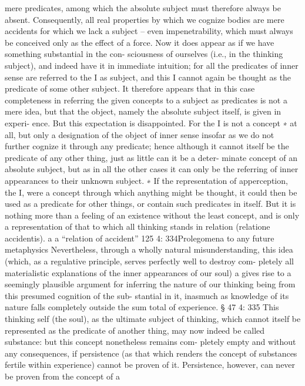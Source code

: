 mere predicates, among which the absolute subject must therefore always
be absent. Consequently, all real properties by which we cognize bodies
are mere accidents for which we lack a subject – even impenetrability,
which must always be conceived only as the effect of a force.
Now it does appear as if we have something substantial in the con-
sciousness of ourselves (i.e., in the thinking subject), and indeed have it
in immediate intuition; for all the predicates of inner sense are referred
to the I as subject, and this I cannot again be thought as the predicate of
some other subject. It therefore appears that in this case completeness in
referring the given concepts to a subject as predicates is not a mere idea,
but that the object, namely the absolute subject itself, is given in experi-
ence. But this expectation is disappointed. For the I is not a concept ∗ at
all, but only a designation of the object of inner sense insofar as we do
not further cognize it through any predicate; hence although it cannot
itself be the predicate of any other thing, just as little can it be a deter-
minate concept of an absolute subject, but as in all the other cases it can
only be the referring of inner appearances to their unknown subject.
∗ If the representation of apperception, the I, were a concept through which
anything might be thought, it could then be used as a predicate for other
things, or contain such predicates in itself. But it is nothing more than a feeling
of an existence without the least concept, and is only a representation of that
to which all thinking stands in relation (relatione accidentis). a
a “relation of accident”
125
4: 334Prolegomena to any future metaphysics
Nevertheless, through a wholly natural misunderstanding, this idea
(which, as a regulative principle, serves perfectly well to destroy com-
pletely all materialistic explanations of the inner appearances of our
soul) a gives rise to a seemingly plausible argument for inferring the
nature of our thinking being from this presumed cognition of the sub-
stantial in it, inasmuch as knowledge of its nature falls completely outside
the sum total of experience.
§ 47
4: 335
This thinking self (the soul), as the ultimate subject of thinking, which
cannot itself be represented as the predicate of another thing, may now
indeed be called substance: but this concept nonetheless remains com-
pletely empty and without any consequences, if persistence (as that which
renders the concept of substances fertile within experience) cannot be
proven of it.
Persistence, however, can never be proven from the concept of a
